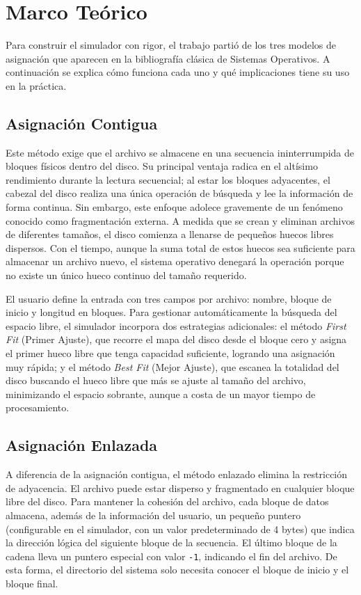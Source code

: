 \documentclass[12pt,a4paper]{article}
\begin{document}
\section{Marco Teórico}

Para construir el simulador con rigor, el trabajo partió de los tres modelos de asignación que aparecen en la bibliografía clásica de Sistemas Operativos. A continuación se explica cómo funciona cada uno y qué implicaciones tiene su uso en la práctica.

\subsection{Asignación Contigua}

Este método exige que el archivo se almacene en una secuencia ininterrumpida de bloques físicos dentro del disco. Su principal ventaja radica en el altísimo rendimiento durante la lectura secuencial; al estar los bloques adyacentes, el cabezal del disco realiza una única operación de búsqueda y lee la información de forma continua. Sin embargo, este enfoque adolece gravemente de un fenómeno conocido como fragmentación externa. A medida que se crean y eliminan archivos de diferentes tamaños, el disco comienza a llenarse de pequeños huecos libres dispersos. Con el tiempo, aunque la suma total de estos huecos sea suficiente para almacenar un archivo nuevo, el sistema operativo denegará la operación porque no existe un único hueco continuo del tamaño requerido.

El usuario define la entrada con tres campos por archivo: nombre, bloque de inicio y longitud en bloques. Para gestionar automáticamente la búsqueda del espacio libre, el simulador incorpora dos estrategias adicionales: el método \textit{First Fit} (Primer Ajuste), que recorre el mapa del disco desde el bloque cero y asigna el primer hueco libre que tenga capacidad suficiente, logrando una asignación muy rápida; y el método \textit{Best Fit} (Mejor Ajuste), que escanea la totalidad del disco buscando el hueco libre que más se ajuste al tamaño del archivo, minimizando el espacio sobrante, aunque a costa de un mayor tiempo de procesamiento.

\subsection{Asignación Enlazada}

A diferencia de la asignación contigua, el método enlazado elimina la restricción de adyacencia. El archivo puede estar disperso y fragmentado en cualquier bloque libre del disco. Para mantener la cohesión del archivo, cada bloque de datos almacena, además de la información del usuario, un pequeño puntero (configurable en el simulador, con un valor predeterminado de 4 bytes) que indica la dirección lógica del siguiente bloque de la secuencia. El último bloque de la cadena lleva un puntero especial con valor \texttt{-1}, indicando el fin del archivo. De esta forma, el directorio del sistema solo necesita conocer el bloque de inicio y el bloque final.
\end{document}
